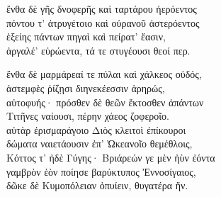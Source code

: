 \quad{}ἔνθα δὲ γῆς δνοφερῆς καὶ ταρτάρου ἠερόεντος \\
πόντου τ' ἀτρυγέτοιο καὶ οὐρανοῦ ἀστερόεντος\\
ἑξείης πάντων πηγαὶ καὶ πείρατ' ἔασιν, \\
ἀργαλέ' εὐρώεντα, τά τε στυγέουσι θεοί περ. 

\quad{}ἔνθα δὲ μαρμάρεαί τε πύλαι καὶ χάλκεος οὐδός, \\
ἀστεμφὲς ῥίζῃσι διηνεκέεσσιν ἀρηρώς, \\
αὐτοφυής· πρόσθεν δὲ θεῶν ἔκτοσθεν ἁπάντων \\
Τιτῆνες ναίουσι, πέρην χάεος ζοφεροῖο. \\
αὐτὰρ ἐρισμαράγοιο Διὸς κλειτοὶ ἐπίκουροι \\
δώματα ναιετάουσιν ἐπ' Ὠκεανοῖο θεμέθλοις,\\
Κόττος τ' ἠδὲ Γύγης· Βριάρεών γε μὲν ἠὺν ἐόντα \\
γαμβρὸν ἑὸν ποίησε βαρύκτυπος Ἐννοσίγαιος,\\
δῶκε δὲ Κυμοπόλειαν ὀπυίειν, θυγατέρα ἥν.



